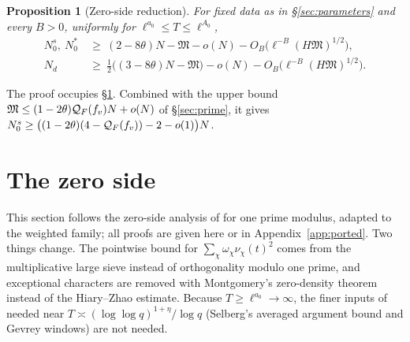 \documentclass[11pt]{amsart}
\newtheorem{proposition}[theorem]{Proposition}
\theoremstyle{definition}
\theoremstyle{remark}
\numberwithin{equation}{section}
\begin{document}
\begin{proposition}[Zero-side reduction]\label{prop:zero}
For fixed data as in \S\ref{sec:parameters} and every $B>0$, uniformly for $\ell^{a_0}\le T\le\ell^{A_0}$,
\begin{align*}
N^s_0,\ N^*_0&\ \ge\ (2-8\theta)N-\mathfrak M-o(N)-O_B\big(\ell^{-B}(H\mathfrak M)^{1/2}\big),\\
N_d&\ \ge\ \tfrac12\big((3-8\theta)N-\mathfrak M\big)-o(N)-O_B\big(\ell^{-B}(H\mathfrak M)^{1/2}\big).
\end{align*}
\end{proposition}
The proof occupies \S\ref{sec:zero}. Combined with the upper bound $\mathfrak M\le(1-2\theta)\mathcal Q_F(f_v)N+o(N)$ of \S\ref{sec:prime}, it gives $N^s_0\ge\big((1-2\theta)(4-\mathcal Q_F(f_v))-2-o(1)\big)N$.

\section{The zero side}\label{sec:zero}

This section follows the zero-side analysis of \cite[\S\S3,5,6,9,10]{HY26} for one prime modulus, adapted to the weighted family; all proofs are given here or in Appendix~\ref{app:ported}. Two things change. The pointwise bound for $\sum_\chi\omega_\chi\nu_\chi(t)^2$ comes from the multiplicative large sieve instead of orthogonality modulo one prime, and exceptional characters are removed with Montgomery's zero-density theorem instead of the Hiary--Zhao estimate. Because $T\ge\ell^{a_0}\to\infty$, the finer inputs of \cite{HY26} needed near $T\asymp(\log\log q)^{1+\eta}/\log q$ (Selberg's averaged argument bound and Gevrey windows) are not needed.
\end{document}
